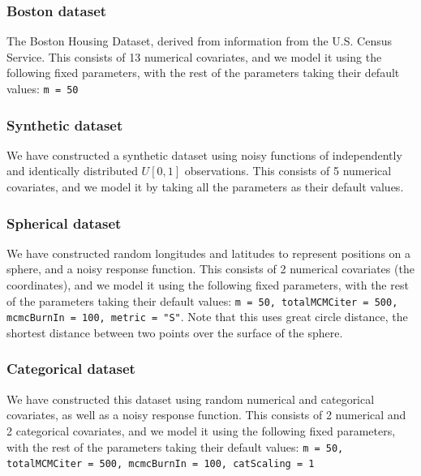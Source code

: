 \documentclass[11pt,twoside,a4paper]{article}
\begin{document}
\subsubsection{Boston dataset}
The Boston Housing Dataset, derived from information from the U.S. Census Service. This consists of 13 numerical covariates, and we model it using the following fixed parameters, with the rest of the parameters taking their default values: \texttt{m = 50}
\subsubsection{Synthetic dataset}
We have constructed a synthetic dataset using noisy functions of independently and identically distributed $U[0,1]$ observations. This consists of 5 numerical covariates, and we model it by taking all the parameters as their default values.
\subsubsection{Spherical dataset}
We have constructed random longitudes and latitudes to represent positions on a sphere, and a noisy response function. This consists of 2 numerical covariates (the coordinates), and we model it using the following fixed parameters, with the rest of the parameters taking their default values: \texttt{m = 50, totalMCMCiter = 500, mcmcBurnIn = 100, metric = "S"}. Note that this uses great circle distance, the shortest distance between two points over the surface of the sphere.
\subsubsection{Categorical dataset}
We have constructed this dataset using random numerical and categorical covariates, as well as a noisy response function. This consists of 2 numerical and 2 categorical covariates, and we model it using the following fixed parameters, with the rest of the parameters taking their default values: \texttt{m = 50, totalMCMCiter = 500, mcmcBurnIn = 100, catScaling = 1}
\end{document}
